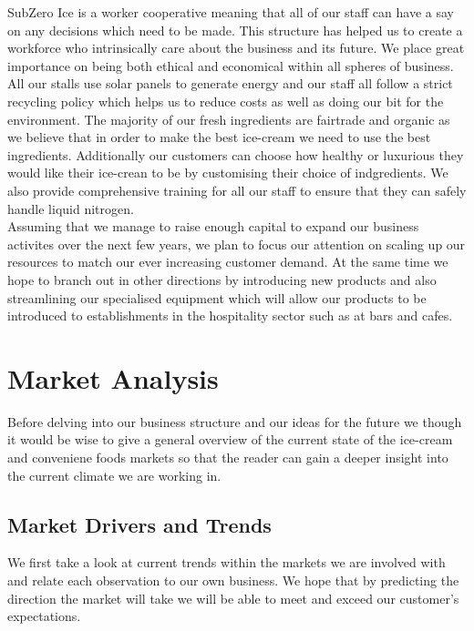 \documentclass{article}
\begin{document}
SubZero Ice is a worker cooperative meaning that all of our staff can have a say on any decisions which need to be made. This structure has helped us to create a workforce who intrinsically care about the business and its future. We place great importance on being both ethical and economical within all spheres of business. All our stalls use solar panels to generate energy and our staff all follow a strict recycling policy which helps us to reduce costs as well as doing our bit for the environment. The majority of our fresh ingredients are fairtrade and organic as we believe that in order to make the best ice-cream we need to use the best ingredients. Additionally our customers can choose how healthy or luxurious they would like their ice-crean to be by customising their choice of indgredients. We also provide comprehensive training for all our staff to ensure that they can safely handle liquid nitrogen. \\

Assuming that we manage to raise enough capital to expand our business activites over the next few years, we plan to focus our attention on scaling up our resources to match our ever increasing customer demand. At the same time we hope to branch out in other directions by introducing new products and also streamlining our specialised equipment which will allow our products to be introduced to establishments in the hospitality sector such as at bars and cafes.

\section{Market Analysis}
  
  Before delving into our business structure and our ideas for the future we though it would be wise to give a general overview of the current state of the ice-cream and conveniene foods markets so that the reader can gain a deeper insight into the current climate we are working in.

  \subsection{Market Drivers and Trends}

   We first take a look at current trends within the markets we are involved with and relate each observation to our own business. We hope that by predicting the direction the market will take we will be able to meet and exceed our customer's expectations.
\end{document}
